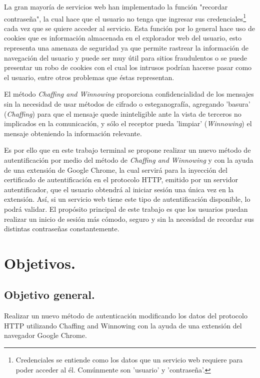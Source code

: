 \documentclass[12pt, a4paper, titlepage]{report}
\begin{document}
		La gran mayoría de servicios web han implementado la función "recordar contraseña", la cual hace que el usuario no tenga que ingresar sus credenciales\footnote{Credenciales se entiende como los datos que un servicio web requiere para poder acceder al él. Comúnmente son 'usuario' y 'contraseña'.} cada vez que se quiere acceder al servicio. Esta función por lo general hace uso de cookies que es información almacenada en el explorador web del usuario, esto representa una amenaza de seguridad ya que permite rastrear la información de navegación del usuario y puede ser muy útil para sitios fraudulentos o se puede presentar un robo de cookies con el cual los intrusos podrían hacerse pasar como el usuario, entre otros problemas que \'estas representan.
	    
	    
	    El método \textit{Chaffing and Winnowing} proporciona confidencialidad de los mensajes sin la necesidad de usar métodos de cifrado o esteganografía, agregando 'basura' (\textit{Chaffing}) para que el mensaje quede ininteligible ante la vista de terceros no implicados en la comunicación, y sólo el receptor pueda 'limpiar' (\textit{Winnowing}) el mensaje obteniendo la información relevante.
	    
		Es por ello que en este trabajo terminal se propone realizar un nuevo método de autentificación por medio del método de \textit{Chaffing and Winnowing} y con la ayuda de una extensión de Google Chrome, la cual servirá para la inyección del certificado de autentificación en el protocolo HTTP, emitido por un servidor autentificador, que el usuario obtendrá al iniciar sesión una única vez en la extensión. Así, si un servicio web tiene este tipo de autentificación disponible, lo podrá validar. El propósito principal de este trabajo es que los usuarios puedan realizar un inicio de sesión más cómodo, seguro y sin la necesidad de recordar sus distintas contraseñas constantemente.
		
		
	\section{Objetivos.}
		\subsection{Objetivo general. }
			Realizar un nuevo método de autenticación modificando los datos del protocolo HTTP utilizando Chaffing and Winnowing con la ayuda de una extensión del navegador Google Chrome.
\end{document}
